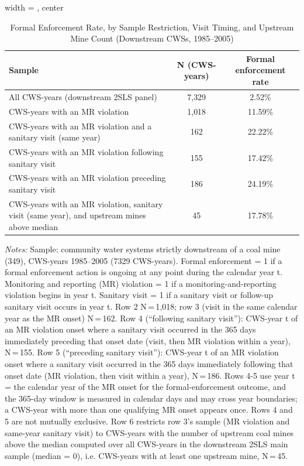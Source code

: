 \begin{table}[htbp]
\caption{\label{tab:sanitary_visit_timing_formal_enforcement_rate} Formal Enforcement Rate, by Sample Restriction, Visit Timing, and Upstream Mine Count (Downstream CWSs, 1985--2005)}
\bigskip
\centering
\begin{adjustbox}{width = \textwidth, center}
\begin{tabular}{lcc}
\toprule
Sample & N (CWS-years) & Formal enforcement rate \\
\midrule
All CWS-years (downstream 2SLS panel) & 7{,}329 & 2.52\% \\
CWS-years with an MR violation & 1{,}018 & 11.59\% \\
CWS-years with an MR violation and a sanitary visit (same year) & 162 & 22.22\% \\
CWS-years with an MR violation following sanitary visit & 155 & 17.42\% \\
CWS-years with an MR violation preceding sanitary visit & 186 & 24.19\% \\
CWS-years with an MR violation, sanitary visit (same year), and upstream mines above median & 45 & 17.78\% \\
\bottomrule
\end{tabular}
\end{adjustbox}
{\tiny\linespread{1}\selectfont \par \raggedright 
\textit{Notes:} Sample: community water systems strictly downstream of a coal mine (349), CWS-years 1985--2005 (7329 CWS-years). Formal enforcement = 1 if a formal enforcement action is ongoing at any point during the calendar year t. Monitoring and reporting (MR) violation = 1 if a monitoring-and-reporting violation begins in year t. Sanitary visit = 1 if a sanitary visit or follow-up sanitary visit occurs in year t. Row 2 N\,=\,1{,}018; row 3 (visit in the same calendar year as the MR onset) N\,=\,162. Row 4 (``following sanitary visit''): CWS-year t of an MR violation onset where a sanitary visit occurred in the 365 days immediately preceding that onset date (visit, then MR violation within a year), N\,=\,155. Row 5 (``preceding sanitary visit''): CWS-year t of an MR violation onset where a sanitary visit occurred in the 365 days immediately following that onset date (MR violation, then visit within a year), N\,=\,186. Rows 4-5 use year t = the calendar year of the MR onset for the formal-enforcement outcome, and the 365-day window is measured in calendar days and may cross year boundaries; a CWS-year with more than one qualifying MR onset appears once. Rows 4 and 5 are not mutually exclusive. Row 6 restricts row 3's sample (MR violation and same-year sanitary visit) to CWS-years with the number of upstream coal mines above the median computed over all CWS-years in the downstream 2SLS main sample (median = 0), i.e. CWS-years with at least one upstream mine, N\,=\,45.
}
\end{table}
